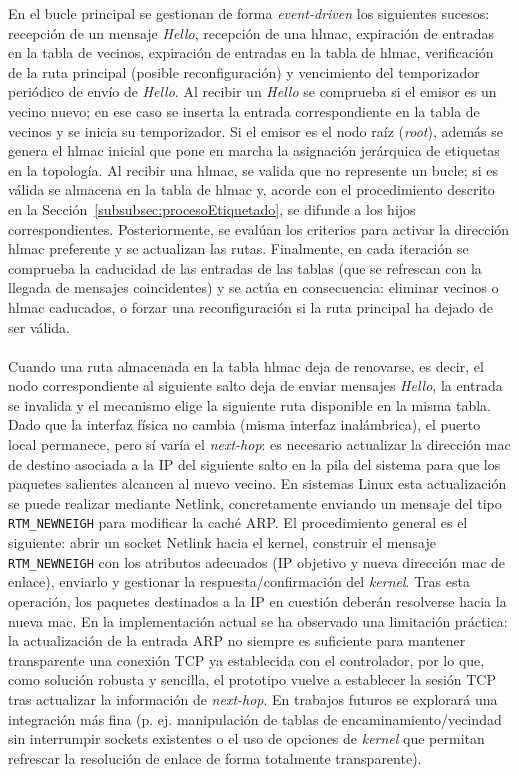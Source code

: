 En el bucle principal se gestionan de forma \textit{event-driven} los siguientes sucesos: recepción de un mensaje \textit{Hello}, recepción de una \gls{hlmac}, expiración de entradas en la tabla de vecinos, expiración de entradas en la tabla de \gls{hlmac}, verificación de la ruta principal (posible reconfiguración) y vencimiento del temporizador periódico de envío de \textit{Hello}. Al recibir un \textit{Hello} se comprueba si el emisor es un vecino nuevo; en ese caso se inserta la entrada correspondiente en la tabla de vecinos y se inicia su temporizador. Si el emisor es el nodo raíz (\textit{root}), además se genera el \gls{hlmac} inicial que pone en marcha la asignación jerárquica de etiquetas en la topología. Al recibir una \gls{hlmac}, se valida que no represente un bucle; si es válida se almacena en la tabla de \gls{hlmac} y, acorde con el procedimiento descrito en la Sección~\ref{subsubsec:procesoEtiquetado}, se difunde a los hijos correspondientes. Posteriormente, se evalúan los criterios para activar la dirección \gls{hlmac} preferente y se actualizan las rutas. Finalmente, en cada iteración se comprueba la caducidad de las entradas de las tablas (que se refrescan con la llegada de mensajes coincidentes) y se actúa en consecuencia: eliminar vecinos o \gls{hlmac} caducados, o forzar una reconfiguración si la ruta principal ha dejado de ser válida.\\
\\
Cuando una ruta almacenada en la tabla \gls{hlmac} deja de renovarse, es decir, el nodo correspondiente al siguiente salto deja de enviar mensajes \textit{Hello}, la entrada se invalida y el mecanismo elige la siguiente ruta disponible en la misma tabla. Dado que la interfaz física no cambia (misma interfaz inalámbrica), el puerto local permanece, pero sí varía el \textit{next-hop}: es necesario actualizar la dirección \gls{mac} de destino asociada a la IP del siguiente salto en la pila del sistema para que los paquetes salientes alcancen al nuevo vecino. En sistemas Linux esta actualización se puede realizar mediante Netlink, concretamente enviando un mensaje del tipo \texttt{RTM\_NEWNEIGH} para modificar la caché ARP. El procedimiento general es el siguiente: abrir un socket Netlink hacia el kernel, construir el mensaje \texttt{RTM\_NEWNEIGH} con los atributos adecuados (IP objetivo y nueva dirección \gls{mac} de enlace), enviarlo y gestionar la respuesta/confirmación del \textit{kernel}. Tras esta operación, los paquetes destinados a la IP en cuestión deberán resolverse hacia la nueva \gls{mac}. En la implementación actual se ha observado una limitación práctica: la actualización de la entrada ARP no siempre es suficiente para mantener transparente una conexión TCP ya establecida con el controlador, por lo que, como solución robusta y sencilla, el prototipo vuelve a establecer la sesión TCP tras actualizar la información de \textit{next-hop}. En trabajos futuros se explorará una integración más fina (p. ej. manipulación de tablas de encaminamiento/vecindad sin interrumpir sockets existentes o el uso de opciones de \textit{kernel} que permitan refrescar la resolución de enlace de forma totalmente transparente).\\

